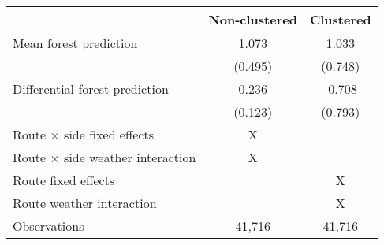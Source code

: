 \begingroup
\setlength{}
\setlength{}\fontsize{9.0pt}{10.8pt}\selectfont
\begin{longtable}{@{\extracolsep{\fill}}lcc}
\toprule
  & Non-clustered & Clustered \\ 
\midrule\addlinespace[2.5pt]
Mean forest prediction & 1.073 & 1.033 \\ 
 & (0.495) & (0.748) \\ 
Differential forest prediction & 0.236 & -0.708 \\ 
{} & {(0.123)} & {(0.793)} \\ 
Route × side fixed effects & X &  \\ 
Route × side weather interaction & X &  \\ 
Route fixed effects &  & X \\ 
Route weather interaction &  & X \\ 
Observations & 41,716 & 41,716 \\ 
\bottomrule
\end{longtable}
\endgroup

